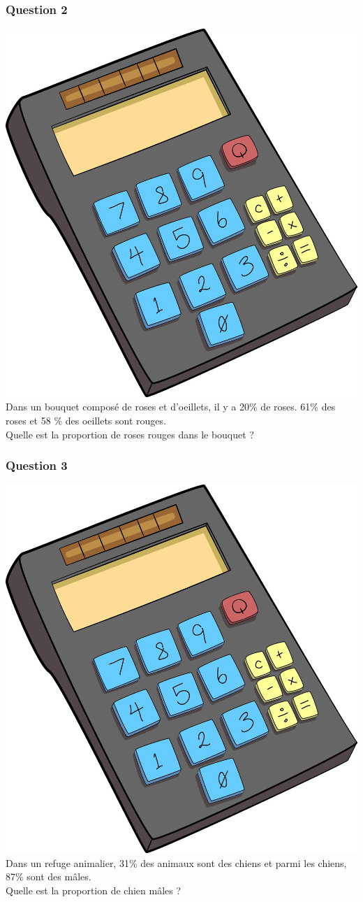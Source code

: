 \documentclass[15pt, mathserif]{beamer}
\begin{document}
\begin{frame} 
	\frametitle{Question 2}
 \includegraphics[scale=0.01]{calculatrice} Dans un bouquet composé de roses et d'oeillets, il y a 20\% de roses. 61\% des roses et 58 \% des oeillets sont rouges. \\ Quelle est la proportion de roses rouges dans le bouquet ?\end{frame}


\begin{frame} 
	\frametitle{Question 3}
\includegraphics[scale=0.01]{calculatrice} Dans un refuge animalier, 31\% des animaux sont des chiens et parmi les chiens, 87\% sont des mâles. \\ Quelle est la proportion de chien mâles ?\end{frame}
\end{document}
